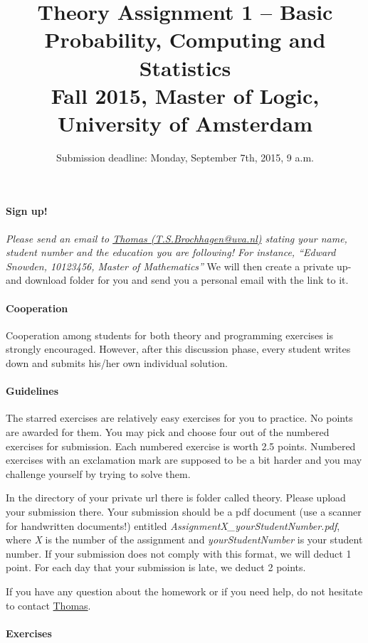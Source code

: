 \documentclass{article}
\title{Theory Assignment 1 -- Basic Probability, Computing and Statistics\\[2mm]
\large{Fall 2015, Master of Logic, University of Amsterdam}}
\author{}
\date{Submission deadline: Monday, September 7th, 2015, 9 a.m.}
\begin{document}
\maketitle

\paragraph{Sign up!} 
\emph{Please send an email to \href{mailto:}{Thomas (T.S.Brochhagen@uva.nl)} stating your name, student number and the education you are following! For instance, ``Edward Snowden, 10123456, Master of Mathematics''} We will then create a private up- and download folder for you and send you a personal email with the link to it.

\paragraph{Cooperation}
Cooperation among students for both theory and programming exercises
is strongly encouraged.  However, after this discussion phase, every student writes down and submits his/her own individual solution.

\paragraph{Guidelines}
The starred exercises are relatively easy exercises for you to practice. No points are awarded for them. You may pick and choose four out of the numbered
exercises for submission. Each numbered exercise is worth 2.5 points. Numbered exercises with an exclamation mark are supposed to be a bit harder and you
may challenge yourself by trying to solve them.

In the directory of your private url there is folder called theory. Please upload your submission there. Your submission should be
a pdf document (use a scanner for handwritten documents!) entitled \textit{AssignmentX\_yourStudentNumber.pdf}, where \textit{X} is the number of the
assignment and \textit{yourStudentNumber} is your student number. If your submission does not comply with this format, we will deduct 1 point. For each day that
your submission is late, we deduct 2 points.

If you have any question about the homework or if you need help, do not hesitate to contact \href{mailto:T.S.Brochhagen@uva.nl}{Thomas}.

\paragraph{Exercises}
\end{document}
